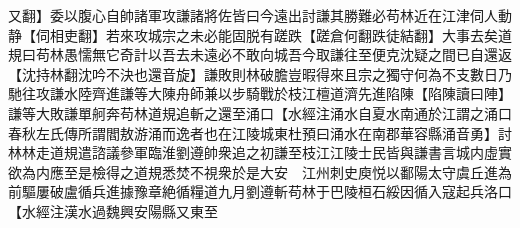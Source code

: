又翻】委以腹心自帥諸軍攻謙諸將佐皆曰今遠出討謙其勝難必苟林近在江津伺人動静【伺相吏翻】若來攻城宗之未必能固脱有蹉跌【蹉倉何翻跌徒結翻】大事去矣道規曰苟林愚懦無它奇計以吾去未遠必不敢向城吾今取謙往至便克沈疑之間已自還返【沈持林翻沈吟不決也還音旋】謙敗則林破膽豈暇得來且宗之獨守何為不支數日乃馳往攻謙水陸齊進謙等大陳舟師兼以步騎戰於枝江檀道濟先進陷陳【陷陳讀曰陣】謙等大敗謙單舸奔苟林道規追斬之還至涌口【水經注涌水自夏水南通於江謂之涌口春秋左氏傳所謂閻敖游涌而逸者也在江陵城東杜預曰涌水在南郡華容縣涌音勇】討林林走道規遣諮議參軍臨淮劉遵帥衆追之初謙至枝江江陵士民皆與謙書言城内虛實欲為内應至是檢得之道規悉焚不視衆於是大安　江州刺史庾悦以鄱陽太守虞丘進為前驅屢破盧循兵進據豫章絶循糧道九月劉遵斬苟林于巴陵桓石綏因循入寇起兵洛口【水經注漢水過魏興安陽縣又東至